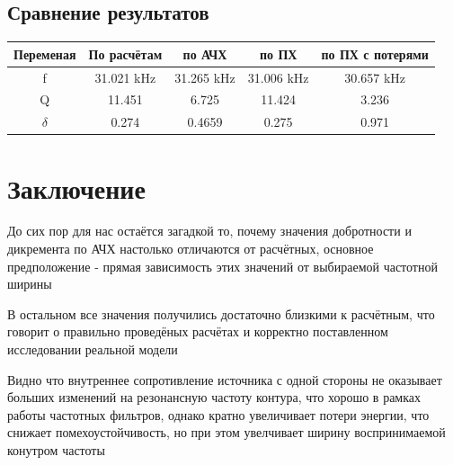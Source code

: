 \documentclass[12pt,a4paper]{article}
\begin{document}
		\subsection{Сравнение результатов}
		
		\centering
		\begin{tabular}{|c|c|c|c|c|}
			\hline
			Переменая & По расчётам & по АЧХ & по ПХ & по ПХ с потерями \\
			\hline
			f & 31.021 kHz & 31.265 kHz & 31.006 kHz & 30.657 kHz \\
 			\hline
			Q & 11.451 & 6.725 & 11.424 & 3.236 \\
			\hline
			$\delta$ & 0.274 & 0.4659 & 0.275 & 0.971 \\
			\hline
		\end{tabular}
		
		\newpage
		
		\section{Заключение}
		
		До сих пор для нас остаётся загадкой то, почему значения добротности и дикремента по АЧХ настолько отличаются от расчётных, основное предположение - прямая зависимость этих значений от выбираемой частотной ширины
		
		В остальном все значения получились достаточно близкими к расчётным, что говорит о правильно проведёных расчётах и корректно поставленном исследовании реальной модели
		
		Видно что внутреннее сопротивление источника с одной стороны не оказывает больших изменений на резонансную частоту контура, что хорошо в рамках работы частотных фильтров, однако кратно увеличивает потери энергии, что снижает помехоустойчивость, но при этом увелчивает ширину воспринимаемой конутром частоты
\end{document}
